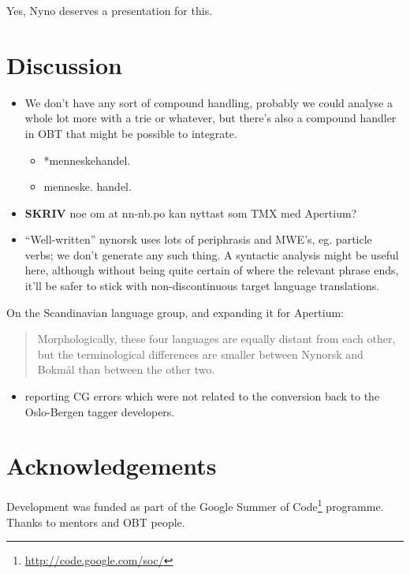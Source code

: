 \documentclass[11pt]{article}
\begin{document}
  Yes, Nyno deserves a presentation for this.

\section{Discussion}

\begin{itemize}
\item We don't have any sort of compound handling, probably we could
  analyse a whole lot more with a trie or whatever, but there's also a
  compound handler in OBT that might be possible to integrate.

\begin{itemize}
\item *menneskehandel.
\item menneske. handel.
\end{itemize}
\item \textbf{SKRIV} noe om at nn-nb.po kan nyttast som TMX med Apertium?

\item ``Well-written'' nynorsk uses lots of periphrasis and MWE's, eg. particle
  verbs; we don't generate any such thing. A syntactic analysis might
  be useful here, although without being quite certain of where the
  relevant phrase ends, it'll be safer to stick with non-discontinuous
  target language translations.
\end{itemize}
On the Scandinavian language group, and expanding it for Apertium:
\begin{quote}
Morphologically, these four languages are equally distant from each
other, but the terminological differences are smaller between Nynorsk
and Bokmål than between the other two. \\
\citep{everson2000sln}
\end{quote}

\begin{itemize} \item reporting CG errors which were not
  related
  to the conversion back to the Oslo-Bergen tagger developers.
\end{itemize} 

\section*{Acknowledgements}

Development was funded as part of the Google Summer of
Code\footnote{\href{http://code.google.com/soc/}{http://code.google.com/soc/}
} programme. Thanks to mentors and OBT people.




\end{document}
